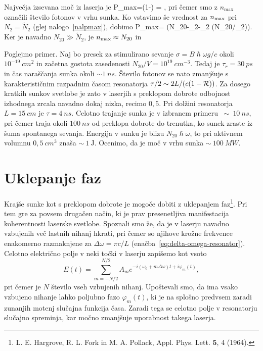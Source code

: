 Največja izsevana moč iz laserja je 
\beq
P_{\rm max}=\left(1-\right) = 
,
\eeq
pri čemer smo z $n_\textrm{max}$ označili število fotonov v vrhu sunka. 
Ko vstavimo še vrednost za $n_{\rm max}$ pri $N_{2}=\tilde{N}_{2}$ (glej 
nalogo~\ref{nalpmax}), dobimo
\beq
P_{\rm max}=\frac {2\hslash \omega}{\tau} \left(N_{20}-_{2}-_{2}
\ln (N_{20}/_{2})\right).
\eeq
Ker je navadno $N_{20}\gg \tilde{N}_2$, je $n_{\rm max} \approx N_{20}$
in 

Poglejmo primer. Naj bo presek za stimulirano sevanje $\sigma=B\hslash \omega g/c$ 
okoli $10^{-19}~\si{cm}^{2}$ in začetna gostota zasedenosti $N_{20}/V=10^{19}~\si{cm}^{-3}$.
Tedaj je $\tau_{r}=30~\si{ps}$ in čas naraščanja
sunka okoli $\sim 1~\si{ns}$. Število fotonov se nato zmanjšuje s
karakterističnim razpadnim časom resonatorja $\tau /2\sim 2L/(c(1-{\cal R}))$. 
Za dosego kratkih sunkov svetlobe je zato v laserjih s preklopom dobrote odbojnost 
izhodnega zrcala navadno dokaj nizka, recimo $0,5$. Pri dolžini resonatorja 
$L=15~\si{cm}$ je $\tau=4~\si{ns}$.
Celotno trajanje sunka je v izbranem primeru $~\sim~10~\si{ns}$, pri
čemer traja okoli $100~\si{ns}$ od preklopa dobrote do trenutka, ko sunek zraste iz šuma
spontanega sevanja. Energija v sunku je blizu $N_{20}\hslash \omega $, to pri
aktivnem volumnu $0,5~\si{cm}^3$ znaša $\sim~1~\si{\joule}$. Ocenimo, da je
moč v vrhu sunka $\sim~100~\si{MW}$.

\section{Uklepanje faz}
\label{chap:Uklepanje}
Krajše sunke kot s preklopom dobrote je mogoče dobiti z uklepanjem 
faz\footnote{L. E. Hargrove, R. L. Fork in M. A. Pollack, Appl. Phys. Lett. $\mathbf{5}$, 4 (1964).}.
Pri tem gre za povsem drugačen način, ki je prav presenetljiva manifestacija 
koherentnosti laserske svetlobe. Spoznali smo že, da je v laserju navadno 
vzbujenih več lastnih nihanj hkrati, pri čemer so njihove krožne frekvence 
enakomerno razmaknjene za $\Delta \omega =\pi c/L$ 
(enačba~\ref{eq:delta-omega-resonator}). Celotno električno
polje v neki točki v laserju zapišemo kot vsoto 
\begin{equation}
E(t)=\sum_{m=-N/2}^{N/2}A_{m}e^{-i(\omega _{0}+m\Delta \omega )t+i\varphi
_{m}(t)},
\label{5.342}
\end{equation}
pri čemer je $N$ število vseh vzbujenih nihanj. Upoštevali smo, da ima vsako
vzbujeno nihanje lahko poljubno fazo $\varphi _{m}(t)$, ki je na splošno predvsem
zaradi zunanjih motenj slučajna funkcija časa. Zaradi tega se
celotno polje v resonatorju slučajno spreminja, kar močno zmanjšuje uporabnost
takega laserja.

